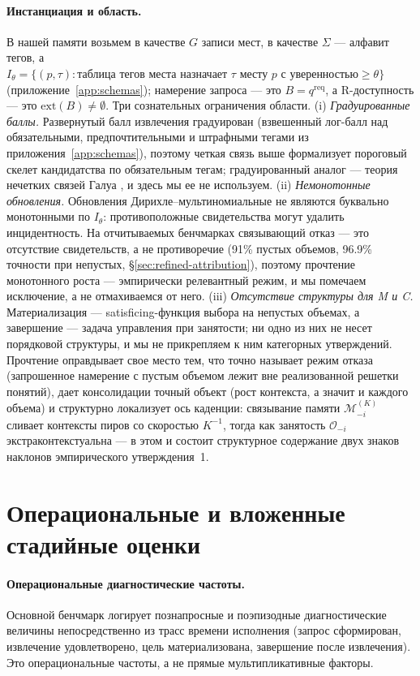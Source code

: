 \documentclass{article}
\begin{document}
\paragraph{Инстанциация и область.}
В нашей памяти возьмем в качестве $G$ записи мест, в качестве $\Sigma$ --- алфавит тегов, а $I_\theta = \{(p,\tau) : \text{таблица тегов места назначает } \tau \text{ месту } p \text{ с уверенностью} \ge \theta\}$ (приложение~\ref{app:schemas}); намерение запроса --- это $B = q^{\mathrm{req}}$, а R-доступность --- это $\mathrm{ext}(B) \ne \emptyset$. Три сознательных ограничения области. (i) \emph{Градуированные баллы.} Развернутый балл извлечения градуирован (взвешенный лог-балл над обязательными, предпочтительными и штрафными тегами из приложения~\ref{app:schemas}), поэтому четкая связь выше формализует пороговый скелет кандидатства по обязательным тегам; градуированный аналог --- теория нечетких связей Галуа \citep{belohlavek1999fuzzy}, и здесь мы ее не используем. (ii) \emph{Немонотонные обновления.} Обновления Дирихле--мультиномиальные не являются буквально монотонными по $I_\theta$: противоположные свидетельства могут удалить инцидентность. На отчитываемых бенчмарках связывающий отказ --- это отсутствие свидетельств, а не противоречие (91\% пустых объемов, 96.9\% точности при непустых, \S\ref{sec:refined-attribution}), поэтому прочтение монотонного роста --- эмпирически релевантный режим, и мы помечаем исключение, а не отмахиваемся от него. (iii) \emph{Отсутствие структуры для M и C.} Материализация --- satisficing-функция выбора на непустых объемах, а завершение --- задача управления при занятости; ни одно из них не несет порядковой структуры, и мы не прикрепляем к ним категорных утверждений. Прочтение оправдывает свое место тем, что точно называет режим отказа (запрошенное намерение с пустым объемом лежит вне реализованной решетки понятий), дает консолидации точный объект (рост контекста, а значит и каждого объема) и структурно локализует ось каденции: связывание памяти $\mathcal{M}^{(K)}_{-i}$ сливает контексты пиров со скоростью $K^{-1}$, тогда как занятость $\mathcal{O}_{-i}$ экстраконтекстуальна --- в этом и состоит структурное содержание двух знаков наклонов эмпирического утверждения~1.

\section{Операциональные и вложенные стадийные оценки}
\label{app:estimators}

\paragraph{Операциональные диагностические частоты.}
Основной бенчмарк логирует познапросные и поэпизодные диагностические величины непосредственно из трасс времени исполнения (запрос сформирован, извлечение удовлетворено, цель материализована, завершение после извлечения). Это операциональные частоты, а не прямые мультипликативные факторы.
\end{document}
